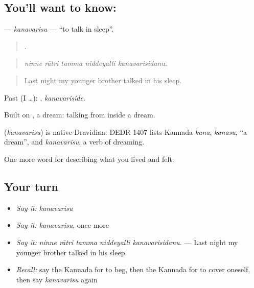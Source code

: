 \subsection*{You'll want to know: }
\textbf{} — \emph{kanavarisu} — \textquotedblleft{}to talk in sleep\textquotedblright{}.

\begin{quote}
    .
\end{quote}

\begin{quote}
\emph{ninne rātri tamma niddeyalli kanavarisidanu.}
\end{quote}

\begin{quote}
Last night my younger brother talked in his sleep.
\end{quote}

Past (I …): , \emph{kanavariside}.

Built on , a dream: talking from inside a dream.

\begin{cousinweb}
\textbf{} (\emph{kanavarisu}) is native Dravidian: DEDR 1407 lists Kannada \emph{kana}, \emph{kanasu}, \textquotedblleft{}a dream\textquotedblright{}, and \emph{kanavarisu}, a verb of dreaming.
\end{cousinweb}

\begin{grammarlens}[title={What you've built}]
One more word for describing what you lived and felt.
\end{grammarlens}

\subsection*{Your turn}
\begin{itemize}
\raggedright
  \item \emph{Say it:} \emph{kanavarisu}
  \item \emph{Say it:} \emph{kanavarisu}, once more
  \item \emph{Say it:} \emph{ninne rātri tamma niddeyalli kanavarisidanu.} — Last night my younger brother talked in his sleep.
  \item \emph{Recall:} say the Kannada for to beg, then the Kannada for to cover oneself, then say \emph{kanavarisu} again
\end{itemize}

